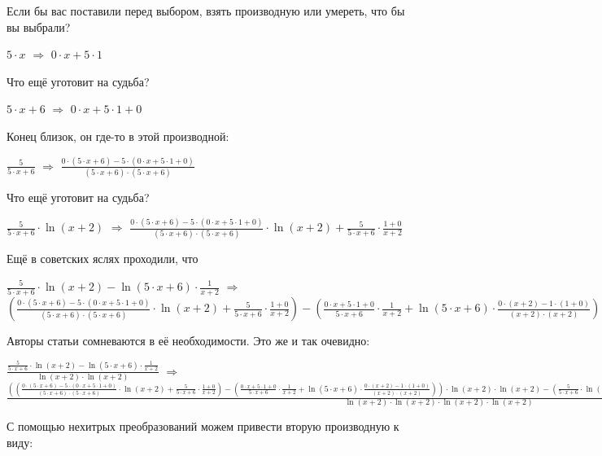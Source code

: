 \documentclass{article}
\begin{document}
Если бы вас поставили перед выбором, взять производную или умереть, что бы вы выбрали?

$5 \cdot x$ $\Rightarrow$ $0 \cdot x + 5 \cdot 1$

Что ещё уготовит на судьба?

$5 \cdot x + 6$ $\Rightarrow$ $0 \cdot x + 5 \cdot 1 + 0$

Конец близок, он где-то в этой производной:

$\frac{5}{5 \cdot x + 6}$ $\Rightarrow$ $\frac{0 \cdot (5 \cdot x + 6) - 5 \cdot (0 \cdot x + 5 \cdot 1 + 0)}{(5 \cdot x + 6) \cdot (5 \cdot x + 6)}$

Что ещё уготовит на судьба?

$\frac{5}{5 \cdot x + 6} \cdot  \ln (x + 2)$ $\Rightarrow$ $\frac{0 \cdot (5 \cdot x + 6) - 5 \cdot (0 \cdot x + 5 \cdot 1 + 0)}{(5 \cdot x + 6) \cdot (5 \cdot x + 6)} \cdot  \ln (x + 2) + \frac{5}{5 \cdot x + 6} \cdot \frac{1 + 0}{x + 2}$

Ещё в советских яслях проходили, что

$\frac{5}{5 \cdot x + 6} \cdot  \ln (x + 2) -  \ln (5 \cdot x + 6) \cdot \frac{1}{x + 2}$ $\Rightarrow$ $(\frac{0 \cdot (5 \cdot x + 6) - 5 \cdot (0 \cdot x + 5 \cdot 1 + 0)}{(5 \cdot x + 6) \cdot (5 \cdot x + 6)} \cdot  \ln (x + 2) + \frac{5}{5 \cdot x + 6} \cdot \frac{1 + 0}{x + 2}) - (\frac{0 \cdot x + 5 \cdot 1 + 0}{5 \cdot x + 6} \cdot \frac{1}{x + 2} +  \ln (5 \cdot x + 6) \cdot \frac{0 \cdot (x + 2) - 1 \cdot (1 + 0)}{(x + 2) \cdot (x + 2)})$

Авторы статьи сомневаются в её необходимости. Это же и так очевидно:

$\frac{\frac{5}{5 \cdot x + 6} \cdot  \ln (x + 2) -  \ln (5 \cdot x + 6) \cdot \frac{1}{x + 2}}{ \ln (x + 2) \cdot  \ln (x + 2)}$ $\Rightarrow$ $\frac{((\frac{0 \cdot (5 \cdot x + 6) - 5 \cdot (0 \cdot x + 5 \cdot 1 + 0)}{(5 \cdot x + 6) \cdot (5 \cdot x + 6)} \cdot  \ln (x + 2) + \frac{5}{5 \cdot x + 6} \cdot \frac{1 + 0}{x + 2}) - (\frac{0 \cdot x + 5 \cdot 1 + 0}{5 \cdot x + 6} \cdot \frac{1}{x + 2} +  \ln (5 \cdot x + 6) \cdot \frac{0 \cdot (x + 2) - 1 \cdot (1 + 0)}{(x + 2) \cdot (x + 2)})) \cdot  \ln (x + 2) \cdot  \ln (x + 2) - (\frac{5}{5 \cdot x + 6} \cdot  \ln (x + 2) -  \ln (5 \cdot x + 6) \cdot \frac{1}{x + 2}) \cdot (\frac{1 + 0}{x + 2} \cdot  \ln (x + 2) +  \ln (x + 2) \cdot \frac{1 + 0}{x + 2})}{ \ln (x + 2) \cdot  \ln (x + 2) \cdot  \ln (x + 2) \cdot  \ln (x + 2)}$

С помощью нехитрых преобразований можем привести вторую производную к виду:
\end{document}
